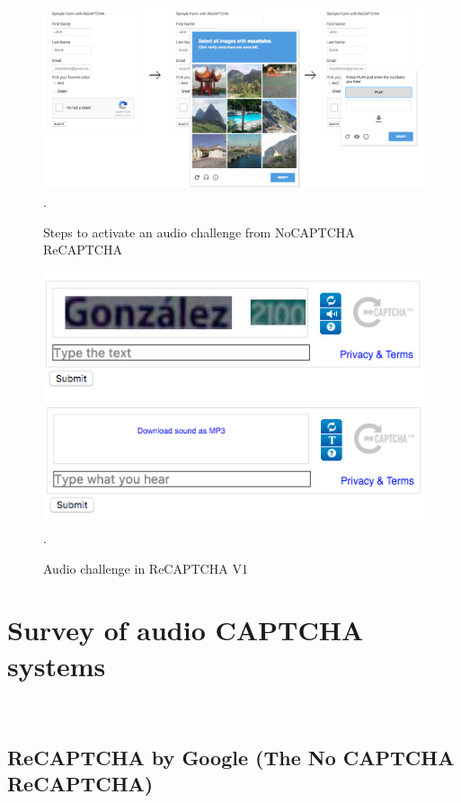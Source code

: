 \begin{figure}[t]
   \centering
   \includegraphics[width=\columnwidth]{figures/recaptcha.jpg}.
   \caption{Steps to activate an audio challenge from NoCAPTCHA ReCAPTCHA}
   \label{fig:speechrecognizers}
\end{figure}

\begin{figure}[t]
   \centering
   \includegraphics[width=\columnwidth]{figures/recaptcha1.jpg}.
   \caption{Audio challenge in ReCAPTCHA V1}
   \label{fig:speechrecognizers}
\end{figure}

\section{Survey of audio CAPTCHA systems} \mbox{} \
\label{sec:previous}

\subsection{ReCAPTCHA by Google (The No CAPTCHA ReCAPTCHA)} \mbox{} \

